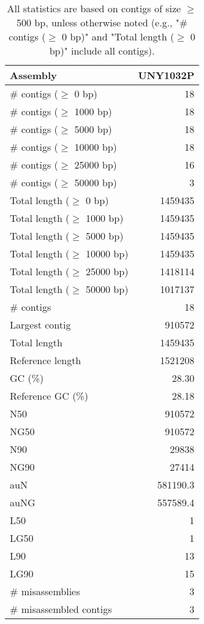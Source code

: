 \documentclass[12pt,a4paper]{article}
\begin{document}
\begin{table}[ht]
\begin{center}
\caption{All statistics are based on contigs of size $\geq$ 500 bp, unless otherwise noted (e.g., "\# contigs ($\geq$ 0 bp)" and "Total length ($\geq$ 0 bp)" include all contigs).}
\begin{tabular}{|l*{1}{|r}|}
\hline
Assembly & UNY1032P \\ \hline
\# contigs ($\geq$ 0 bp) & 18 \\ \hline
\# contigs ($\geq$ 1000 bp) & 18 \\ \hline
\# contigs ($\geq$ 5000 bp) & 18 \\ \hline
\# contigs ($\geq$ 10000 bp) & 18 \\ \hline
\# contigs ($\geq$ 25000 bp) & 16 \\ \hline
\# contigs ($\geq$ 50000 bp) & 3 \\ \hline
Total length ($\geq$ 0 bp) & 1459435 \\ \hline
Total length ($\geq$ 1000 bp) & 1459435 \\ \hline
Total length ($\geq$ 5000 bp) & 1459435 \\ \hline
Total length ($\geq$ 10000 bp) & 1459435 \\ \hline
Total length ($\geq$ 25000 bp) & 1418114 \\ \hline
Total length ($\geq$ 50000 bp) & 1017137 \\ \hline
\# contigs & 18 \\ \hline
Largest contig & 910572 \\ \hline
Total length & 1459435 \\ \hline
Reference length & 1521208 \\ \hline
GC (\%) & 28.30 \\ \hline
Reference GC (\%) & 28.18 \\ \hline
N50 & 910572 \\ \hline
NG50 & 910572 \\ \hline
N90 & 29838 \\ \hline
NG90 & 27414 \\ \hline
auN & 581190.3 \\ \hline
auNG & 557589.4 \\ \hline
L50 & 1 \\ \hline
LG50 & 1 \\ \hline
L90 & 13 \\ \hline
LG90 & 15 \\ \hline
\# misassemblies & 3 \\ \hline
\# misassembled contigs & 3 \\ \hline

\end{tabular}
\end{center}
\end{table}
\end{document}
